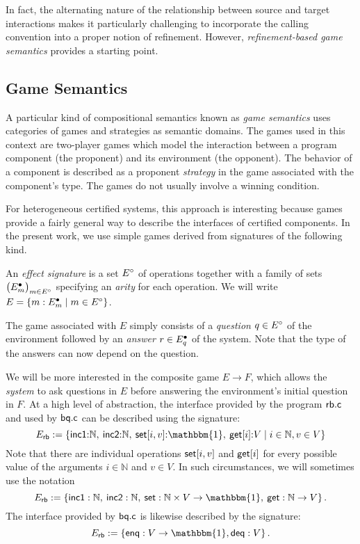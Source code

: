 \documentclass[acmsmall,review,anonymous]{acmart}\settopmatter{printfolios=true,printccs=false,printacmref=false}
\begin{document}
In fact,
the alternating nature of the relationship between
source and target interactions
makes it particularly challenging to
incorporate the calling convention into
a proper notion of refinement.
However,
\emph{refinement-based game semantics} \cite{rbgs-cal}
provides a starting point.



\subsection{Game Semantics} %

A particular kind of compositional semantics
known as \emph{game semantics} uses
categories of games and strategies
as semantic domains.
The games used in this context are
two-player games
which model the interaction between
a program component (the proponent)
and its environment (the opponent).
The behavior of a component
is described as a proponent \emph{strategy}
in the game associated with the component's type.
The games do not usually involve
a winning condition. %

For heterogeneous certified systems,
this approach is interesting
because games provide a fairly general way to describe
the interfaces of certified components.
In the present work,
we use simple games
derived from signatures of the following kind.

\begin{definition}
An \emph{effect signature} is a set $E^\circ$ of operations
together with a family of sets $\big( E^\bullet_m \big)_{m \in E^\circ}$
specifying an \emph{arity} for each operation.
We will write
  $E = \{ m : E^\bullet_m \mid m \in E^\circ \}$.
\end{definition}

The game associated with $E$ simply consists of
a \emph{question} $q \in E^\circ$ of the environment
followed by an \emph{answer} $r \in E^\bullet_q$ of the system.
Note that the type of the answers can now depend on the question.

We will be more interested in the composite game $E \rightarrow F$,
which allows the \emph{system} to ask questions in $E$
before answering the environment's initial question in $F$.
At a high level of abstraction,
the interface provided by the program $ \mathsf{rb.c} $ %
and used by $ \mathsf{bq.c} $ %
can be described using the signature:
\[
  E_\kw{rb} := \{
    \kw{inc1} {:} \mathbb{N}, \:
    \kw{inc2} {:} \mathbb{N}, \:
    \kw{set}[i, v] {:} \mathbbm{1}, \:
    \kw{get}[i] {:} V \mid
    i \in \mathbb{N}, v \in V \}
\]
Note that there are individual operations
$ \mathsf{set} [i, v]$ and $ \mathsf{get} [i]$
for every possible value of the arguments
$i \in \mathbb{N}$ and $v \in V$.
In such circumstances,
we will sometimes use the notation
\[
  E_\kw{rb} := \{
    \kw{inc1} : \mathbb{N}, \:
    \kw{inc2} : \mathbb{N}, \:
    \kw{set} : \mathbb{N} \times V \rightarrow \mathbbm{1}, \:
    \kw{get} : \mathbb{N} \rightarrow V \}
  \,.
\]
The interface provided by $ \mathsf{bq.c} $
is likewise described by the signature:
\[
  E_\kw{rb} := \{
    \kw{enq} : V \rightarrow \mathbbm{1},
    \kw{deq} : V \}
  \,.
\]
\end{document}
